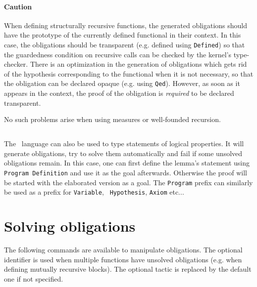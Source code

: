 \paragraph{Caution}
When defining structurally recursive functions, the
generated obligations should have the prototype of the currently defined functional
in their context. In this case, the obligations should be transparent
(e.g. defined using {\tt Defined}) so that the guardedness condition on
recursive calls can be checked by the
kernel's type-checker. There is an optimization in the generation of
obligations which gets rid of the hypothesis corresponding to the
functional when it is not necessary, so that the obligation can be
declared opaque (e.g. using {\tt Qed}). However, as soon as it appears in the
context, the proof of the obligation is \emph{required} to be declared transparent.

No such problems arise when using measures or well-founded recursion.

\subsection{}

The \Russell\ language can also be used to type statements of logical
properties. It will generate obligations, try to solve them
automatically and fail if some unsolved obligations remain. 
In this case, one can first define the lemma's
statement using {\tt Program Definition} and use it as the goal afterwards.
Otherwise the proof will be started with the elaborated version as a goal.
The {\tt Program} prefix can similarly be used as a prefix for {\tt Variable}, {\tt
  Hypothesis}, {\tt Axiom} etc...

\section{Solving obligations}
The following commands are available to manipulate obligations. The
optional identifier is used when multiple functions have unsolved
obligations (e.g. when defining mutually recursive blocks). The optional
tactic is replaced by the default one if not specified.

